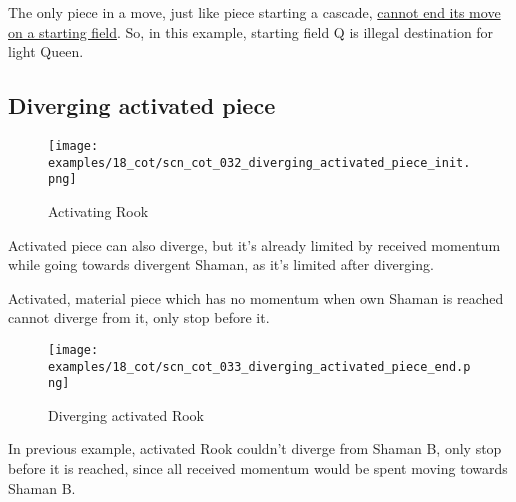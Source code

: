 The only piece in a move, just like piece starting a cascade,
\hyperref[fig:scn_mv_53_static_move_is_illegal_init]{cannot end its move on a starting field}.
So, in this example, starting field Q is illegal destination for light Queen.

\clearpage %

\subsection*{Diverging activated piece}
\label{sec:Conquest of Tlalocan/Divergence/Diverging activated piece}

\vspace*{-1.4\baselineskip}
\noindent
\begin{figure}[!h]
\texttt{[image: examples/18\_cot/scn\_cot\_032\_diverging\_activated\_piece\_init.png]}
\vspace*{-1.3\baselineskip}
\caption{Activating Rook}
\label{fig:scn_cot_032_diverging_activated_piece_init}
\end{figure}

\vspace*{-0.4\baselineskip}
Activated piece can also diverge, but it's already limited by received momentum
while going towards divergent Shaman, as it's limited after diverging.

Activated, material piece which has no momentum when own Shaman is reached cannot
diverge from it, only stop before it.

\clearpage %

\vspace*{-2.1\baselineskip}
\noindent
\begin{figure}[!h]
\texttt{[image: examples/18\_cot/scn\_cot\_033\_diverging\_activated\_piece\_end.png]}
\vspace*{-1.3\baselineskip}
\caption{Diverging activated Rook}
\label{fig:scn_cot_033_diverging_activated_piece_end}
\end{figure}

\vspace*{-0.4\baselineskip}
In previous example, activated Rook couldn't diverge from Shaman B, only stop before
it is reached, since all received momentum would be spent moving towards Shaman B.

